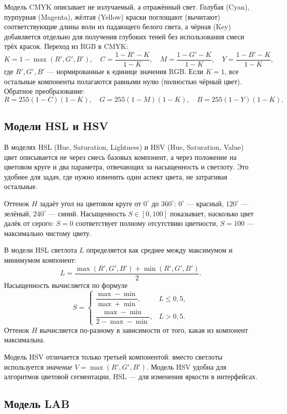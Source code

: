 \documentclass[a4paper,12pt]{article}
\begin{document}
Модель CMYK описывает не излучаемый, а отражённый свет. Голубая (Cyan), пурпурная (Magenta), жёлтая (Yellow) краски поглощают (вычитают) соответствующие длины волн из падающего белого света, а чёрная (Key) добавляется отдельно для получения глубоких теней без использования смеси трёх красок. Переход из RGB в CMYK:
\[
K = 1 - \max(R', G', B'), \quad
C = \frac{1 - R' - K}{1 - K}, \quad
M = \frac{1 - G' - K}{1 - K}, \quad
Y = \frac{1 - B' - K}{1 - K},
\]
где $R', G', B'$ --- нормированные к единице значения RGB. Если $K = 1$, все остальные компоненты полагаются равными нулю (полностью чёрный цвет). Обратное преобразование:
\[
R = 255(1 - C)(1 - K), \quad
G = 255(1 - M)(1 - K), \quad
B = 255(1 - Y)(1 - K).
\]

\subsection{Модели HSL и HSV}

В моделях HSL (Hue, Saturation, Lightness) и HSV (Hue, Saturation, Value) цвет описывается не через смесь базовых компонент, а через положение на цветовом круге и два параметра, отвечающих за насыщенность и светлоту. Это удобнее для задач, где нужно изменить один аспект цвета, не затрагивая остальные.

Оттенок $H$ задаёт угол на цветовом круге от $0^\circ$ до $360^\circ$: $0^\circ$ --- красный, $120^\circ$ --- зелёный, $240^\circ$ --- синий. Насыщенность $S \in [0, 100]$ показывает, насколько цвет далёк от серого: $S = 0$ соответствует полному отсутствию цветности, $S = 100$ --- максимально чистому цвету.

В модели HSL светлота $L$ определяется как среднее между максимумом и минимумом компонент:
\[
L = \frac{\max(R', G', B') + \min(R', G', B')}{2}.
\]
Насыщенность вычисляется по формуле
\[
S = \begin{cases}
\dfrac{\max - \min}{\max + \min}, & L \le 0{,}5, \\[6pt]
\dfrac{\max - \min}{2 - \max - \min}, & L > 0{,}5.
\end{cases}
\]
Оттенок $H$ вычисляется по-разному в зависимости от того, какая из компонент максимальна.

Модель HSV отличается только третьей компонентой: вместо светлоты используется \emph{значение} $V = \max(R', G', B')$. Модель HSV удобна для алгоритмов цветовой сегментации, HSL --- для изменения яркости в интерфейсах.

\subsection{Модель LAB}
\end{document}
